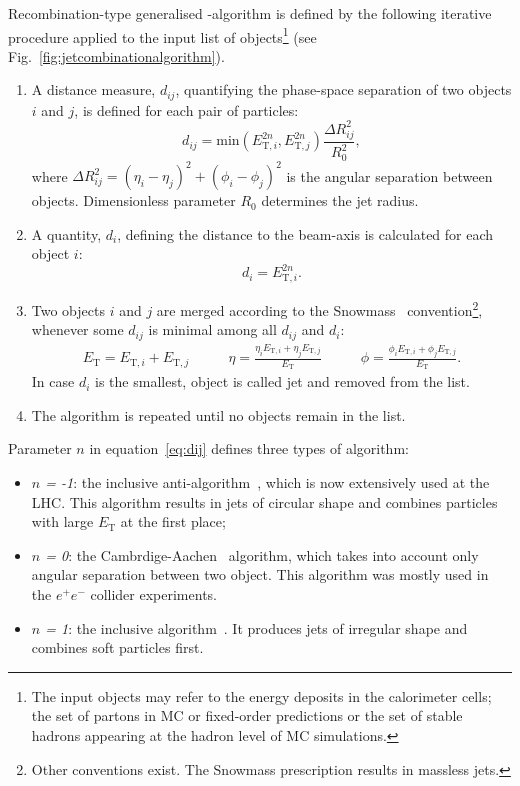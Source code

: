 Recombination-type generalised \kt-algorithm is defined by the following iterative procedure applied to the input list of objects\footnote{The input objects may refer to the energy deposits in the calorimeter cells; the set of partons in MC or fixed-order predictions or the set of stable hadrons appearing at the hadron level of MC simulations.} (see Fig.~\ref{fig:jetcombinationalgorithm}).
\begin{enumerate}
	\item A distance measure, $d_{ij}$, quantifying the phase-space separation of two objects $i$ and $j$, is defined for each pair of particles:
	\begin{equation}
	  d_{ij} = \mathrm{\text{min}} \left( E_{\text{T},i}^{2n}, E_{\text{T},j}^{2n} \right) \dfrac{\Delta R_{ij}^2}{R_0^2},
		\label{eq:dij}
	\end{equation}
	where $\Delta R_{ij}^2 = \left( \eta_{i} - \eta_{j} \right)^2 + \left( \phi_{i} - \phi_{j} \right)^2$ is the angular separation between objects. Dimensionless parameter $R_0$ determines the jet radius.
	\item A quantity, $d_i$, defining the distance to the beam-axis is calculated for each object $i$:
		\begin{equation}
	  d_{i} = E_{\text{T},i}^{2n}.
		\label{eq:di}
	\end{equation}
	\item Two objects $i$ and $j$ are merged according to the Snowmass~\cite{proc:snowmass:1990:134} convention\footnote{Other conventions exist. The Snowmass prescription results in massless jets.}, whenever some $d_{ij}$ is minimal among all $d_{ij}$ and $d_{i}$:
	\begin{align}
		E_\text{T} = E_{\text{T},i} + E_{\text{T},j} & \qquad \eta = \frac{\eta_iE_{\text{T},i} + \eta_jE_{\text{T},j}}{E_\text{T}} & \qquad \phi = \frac{\phi_iE_{\text{T},i} + \phi_jE_{\text{T},j}}{E_\text{T}}.			 \label{eq:snowmass}
	\end{align}
	In case $d_i$ is the smallest, object is called jet and removed from the list.
	\item The algorithm is repeated until no objects remain in the list.
\end{enumerate}
Parameter $n$ in equation~\ref{eq:dij} defines three types of algorithm:
\begin{itemize}
	\item \textsl{$n$ = -1}: the inclusive anti-\kt algorithm~\cite{pub:antikt}, which is now extensively used at the LHC. This algorithm results in jets of circular shape and combines particles with large $E_\text{T}$ at the first place;
	\item \textsl{$n$ = 0}: the Cambrdige-Aachen~\cite{pub:cambidgeaachen} algorithm, which takes into account only angular separation between two object.  This algorithm was mostly used in the $e^+e^-$ collider experiments.
	\item \textsl{$n$ = 1}: the inclusive \kt algorithm~\cite{pub:kt}. It produces jets of irregular shape and combines soft particles first.
\end{itemize}

